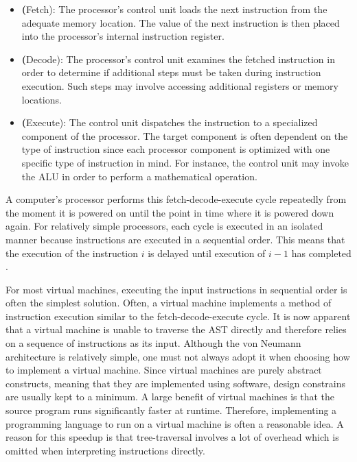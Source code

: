 \begin{itemize}
	\item \textbf(Fetch): The processor's control unit loads the next instruction from the adequate memory location.
	      The value of the next instruction is then placed into the processor's internal instruction register.
	\item \textbf(Decode):
	      The processor's control unit examines the fetched instruction in order to determine if additional steps must be taken during instruction execution.
	      Such steps may involve accessing additional registers or memory locations.
	\item \textbf(Execute):
	      The control unit dispatches the instruction to a specialized component of the processor.
	      The target component is often dependent on the type of instruction since each processor component is optimized with one specific type of instruction in mind.
	      For instance, the control unit may invoke the ALU in order to perform a mathematical operation.
\end{itemize}

A computer's processor performs this fetch-decode-execute cycle repeatedly from the moment it is powered on until the point in time where it is powered down again.
For relatively simple processors, each cycle is executed in an isolated manner because instructions are executed in a sequential order.
This means that the execution of the instruction $i$ is delayed until execution of $i - 1$ has completed \cite[pp.~208-209]{Ledin2020-yp}.

For most virtual machines, executing the input instructions in sequential order is often the simplest solution.
Often, a virtual machine implements a method of instruction execution similar to the fetch-decode-execute cycle.
It is now apparent that a virtual machine is unable to traverse the AST directly and therefore relies on a sequence of instructions as its input.
Although the von Neumann architecture is relatively simple, one must not always adopt it when choosing how to implement a virtual machine.
Since virtual machines are purely abstract constructs, meaning that they are implemented using software, design constrains are usually kept to a minimum.
A large benefit of virtual machines is that the source program runs significantly faster at runtime.
Therefore, implementing a programming language to run on a virtual machine is often a reasonable idea.
A reason for this speedup is that tree-traversal involves a lot of overhead which is omitted when interpreting instructions directly.

